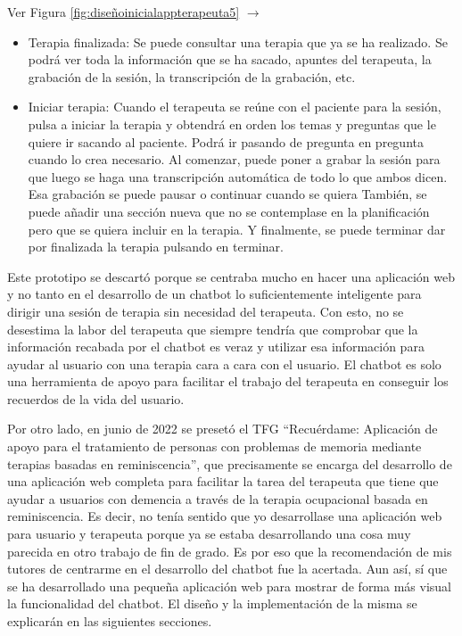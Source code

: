 Ver Figura \ref{fig:diseñoinicialappterapeuta5} $\rightarrow$
\begin{itemize}
	\item Terapia finalizada: Se puede consultar una terapia que ya se ha realizado. Se podrá ver toda la información que se ha sacado, apuntes del terapeuta, la grabación de la sesión, la transcripción de la grabación, etc.
	\item Iniciar terapia: Cuando el terapeuta se reúne con el paciente para la sesión, pulsa a iniciar la terapia y obtendrá en orden los temas y preguntas que le quiere ir sacando al paciente. Podrá ir pasando de pregunta en pregunta cuando lo crea necesario. Al comenzar, puede poner a grabar la sesión para que luego se haga una transcripción automática de todo lo que ambos dicen. Esa grabación se puede pausar o continuar cuando se quiera También, se puede añadir una sección nueva que no se contemplase en la planificación pero que se quiera incluir en la terapia. Y finalmente, se puede terminar dar por finalizada la terapia pulsando en terminar. 
\end{itemize}

Este prototipo se descartó porque se centraba mucho en hacer una aplicación web y no tanto en el desarrollo de un chatbot lo suficientemente inteligente para dirigir una sesión de terapia sin necesidad del terapeuta. Con esto, no se desestima la labor del terapeuta que siempre tendría que comprobar que la información recabada por el chatbot es veraz y utilizar esa información para ayudar al usuario con una terapia cara a cara con el usuario. El chatbot es solo una herramienta de apoyo para facilitar el trabajo del terapeuta en conseguir los recuerdos de la vida del usuario. 

Por otro lado, en junio de 2022 se presetó el TFG ``Recuérdame: Aplicación de apoyo para el tratamiento de personas con problemas de memoria mediante terapias basadas en reminiscencia'', que precisamente se encarga del desarrollo de una aplicación web completa para facilitar la tarea del terapeuta que tiene que ayudar a usuarios con demencia a través de la terapia ocupacional basada en reminiscencia. Es decir, no tenía sentido que yo desarrollase una aplicación web para usuario y terapeuta porque ya se estaba desarrollando una cosa muy parecida en otro trabajo de fin de grado. Es por eso que la recomendación de mis tutores de centrarme en el desarrollo del chatbot fue la acertada. Aun así, sí que se ha desarrollado una pequeña aplicación web para mostrar de forma más visual la funcionalidad del chatbot. El diseño y la implementación de la misma se explicarán en las siguientes secciones.

